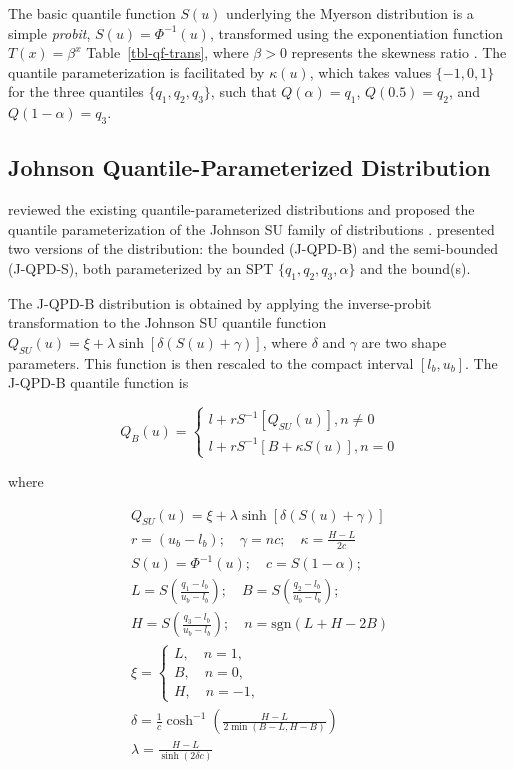 \documentclass[
  fleqn,
  deca,
  blindrev
]{informs4}
\begin{document}
The basic quantile function
\citep{gilchrist2000StatisticalModellingQuantile, lampasi2008AlternativeApproachMeasurement}
\(S(u)\) underlying the Myerson distribution is a simple \emph{probit},
\(S(u) = \Phi^{-1}(u)\), transformed using the exponentiation function
\(T(x) = \beta^{x}\) Table~\ref{tbl-qf-trans}, where \(\beta > 0\)
represents the skewness ratio
\citep{gilchrist2000StatisticalModellingQuantile}. The quantile
parameterization is facilitated by \(\kappa(u)\), which takes values
\(\{-1,0,1\}\) for the three quantiles \(\{q_1, q_2, q_3\}\), such that
\(Q(\alpha) = q_1\), \(Q(0.5) = q_2\), and \(Q(1 - \alpha) = q_3\).

\subsection{Johnson Quantile-Parameterized
Distribution}\label{johnson-quantile-parameterized-distribution}

\citet{hadlock2017QuantileparameterizedMethodsQuantifying} reviewed the
existing quantile-parameterized distributions and proposed the quantile
parameterization of the Johnson SU family of distributions
\citep{johnson1994ContinuousUnivariateDistributions}.
\citet{hadlock2017JohnsonQuantileParameterizedDistributions} presented
two versions of the distribution: the bounded (J-QPD-B) and the
semi-bounded (J-QPD-S), both parameterized by an SPT
\(\{q_1, q_2, q_3, \alpha\}\) and the bound(s).

The J-QPD-B distribution is obtained by applying the inverse-probit
transformation to the Johnson SU quantile function
\(Q_{SU}(u) = \xi + \lambda\sinh[\delta(S(u) + \gamma)]\), where
\(\delta\) and \(\gamma\) are two shape parameters. This function is
then rescaled to the compact interval \([l_b, u_b]\). The J-QPD-B
quantile function is

\[
Q_B(u)=
\begin{cases}
l+rS^{-1}\left[Q_{SU}(u)\right], n\neq0\\
l+rS^{-1}\left[B+\kappa S(u)\right],n=0
\end{cases}
\]

where

\[
\begin{gathered}
Q_{SU}(u) = \xi + \lambda\sinh[\delta(S(u) + \gamma)]\\
r=(u_b-l_b); \quad \gamma=nc; \quad \kappa=\frac{H-L}{2c}\\
S(u)=\Phi^{-1}(u); \quad c=S(1-\alpha);\\
L=S\left(\frac{q_1-l_b}{u_b-l_b}\right); \quad  B=S\left(\frac{q_2-l_b}{u_b-l_b}\right);\\
H=S\left(\frac{q_3-l_b}{u_b-l_b}\right); \quad n=\text{sgn}(L+H-2B)\\
\xi=\begin{cases}L, \quad n=1,\\
B, \quad n=0,\\
H, \quad n=-1,\end{cases}\\
\delta=\frac{1}{c}\cosh^{-1}\left(\frac{H-L}{2\min(B-L,H-B)}\right)\\
\lambda=\frac{H-L}{\sinh(2\delta c)}
\end{gathered}
\]
\end{document}
